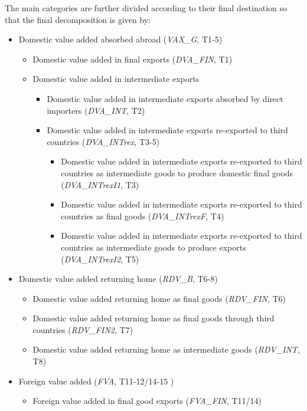 \documentclass[a4paper]{article}\usepackage[]{graphicx}\usepackage[]{color}
\begin{document}
The main categories are further divided according to their final destination so that the final decomposition is given by:
\begin{itemize}
\item Domestic value added absorbed abroad (\textit{VAX\_G}, T1-5)
\begin{itemize}
\item Domestic value added in final exports (\textit{DVA\_FIN}, T1)
\item Domestic value added in intermediate exports
\begin{itemize}
\item Domestic value added in intermediate exports absorbed by direct importers (\textit{DVA\_INT}, T2)
\item Domestic value added in intermediate exports re-exported to third countries (\textit{DVA\_INTrex}, T3-5)
\begin{itemize}
\item Domestic value added in intermediate exports re-exported to third countries as intermediate goods to produce domestic final goods (\textit{DVA\_INTrexI1}, T3)
\item Domestic value added in intermediate exports re-exported to third countries as  final goods (\textit{DVA\_INTrexF}, T4)
\item Domestic value added in intermediate exports re-exported to third countries as intermediate goods to produce exports (\textit{DVA\_INTrexI2}, T5)
\end{itemize}
\end{itemize}
\end{itemize}
\item Domestic value added returning home (\textit{RDV\_B}, T6-8)
\begin{itemize}
\item Domestic value added returning home as final goods (\textit{RDV\_FIN}, T6)
\item Domestic value added returning home as final goods through third countries (\textit{RDV\_FIN2}, T7)
\item Domestic value added returning home as intermediate goods (\textit{RDV\_INT}, T8)
\end{itemize}
\item Foreign value added (\textit{FVA}, T11-12/14-15 )
\begin{itemize}
\item Foreign value added in final good exports (\textit{FVA\_FIN}, T11/14)
\begin{itemize}

\end{itemize}
\end{itemize}
\end{itemize}
\end{document}

